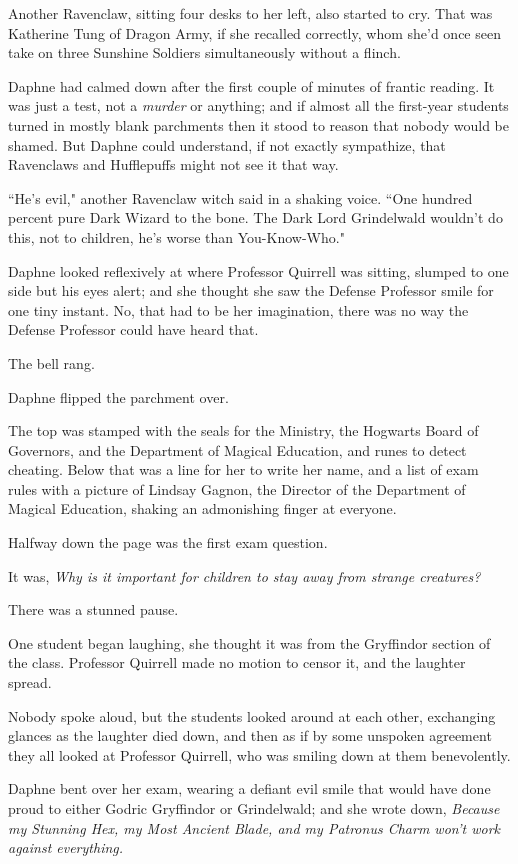 Another Ravenclaw, sitting four desks to her left, also started to cry. That was Katherine Tung of Dragon Army, if she recalled correctly, whom she'd once seen take on three Sunshine Soldiers simultaneously without a flinch.

Daphne had calmed down after the first couple of minutes of frantic reading. It was just a test, not a \emph{murder} or anything; and if almost all the first-year students turned in mostly blank parchments then it stood to reason that nobody would be shamed. But Daphne could understand, if not exactly sympathize, that Ravenclaws and Hufflepuffs might not see it that way.

``He's evil," another Ravenclaw witch said in a shaking voice. ``One hundred percent pure Dark Wizard to the bone. The Dark Lord Grindelwald wouldn't do this, not to children, he's worse than You-Know-Who."

Daphne looked reflexively at where Professor Quirrell was sitting, slumped to one side but his eyes alert; and she thought she saw the Defense Professor smile for one tiny instant. No, that had to be her imagination, there was no way the Defense Professor could have heard that.

The bell rang.

Daphne flipped the parchment over.

The top was stamped with the seals for the Ministry, the Hogwarts Board of Governors, and the Department of Magical Education, and runes to detect cheating. Below that was a line for her to write her name, and a list of exam rules with a picture of Lindsay Gagnon, the Director of the Department of Magical Education, shaking an admonishing finger at everyone.

Halfway down the page was the first exam question.

It was, \emph{Why is it important for children to stay away from strange creatures?}

There was a stunned pause.

One student began laughing, she thought it was from the Gryffindor section of the class. Professor Quirrell made no motion to censor it, and the laughter spread.

Nobody spoke aloud, but the students looked around at each other, exchanging glances as the laughter died down, and then as if by some unspoken agreement they all looked at Professor Quirrell, who was smiling down at them benevolently.

Daphne bent over her exam, wearing a defiant evil smile that would have done proud to either Godric Gryffindor or Grindelwald; and she wrote down, \emph{Because my Stunning Hex, my Most Ancient Blade, and my Patronus Charm won't work against everything.}

